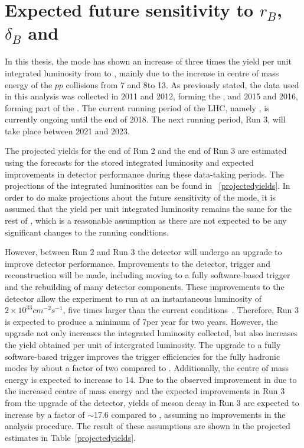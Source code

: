 \section{Expected future sensitivity to $r_B$, $\delta_B$ and \Pgamma}
\label{sec:interpretation:futuresensitivity}

In this thesis, the \btodkst mode has shown an increase of three times the yield per unit integrated luminosity from \runone to \runtwo, mainly due to the increase in centre of mass energy of the $pp$ collisions from 7 and 8\tev to 13\tev. As previously stated, the data used in this analysis was collected in 2011 and 2012, forming the \runone \dataset, and 2015 and 2016, forming part of the \runtwo \dataset. The current running period of the LHC, namely \runtwo, is currently ongoing until the end of 2018. The next running period, Run 3, will take place between 2021 and 2023.

The projected yields for the end of Run 2 and the end of Run 3 are estimated using the forecasts for the stored integrated luminosity and expected improvements in detector performance during these data-taking periods. The projections of the integrated luminosities can be found in \tab~\ref{projectedyields}. In order to do make projections about the future sensitivity of the \btodkst mode, it is assumed that the yield per unit integrated luminosity remains the same for the rest of \runtwo, which is a reasonable assumption as there are not expected to be any significant changes to the running conditions. 

However, between Run 2 and Run 3 the detector will undergo an upgrade to improve detector performance. Improvements to the detector, trigger and reconstruction will be made, including moving to a fully software-based trigger~\cite{CERN-LHCC-2014-016} and the rebuilding of many detector components. These improvements to the detector allow the experiment to run at an instantaneous luminosity of $2 \times 10^{33} cm^{-2}s^{-1}$, five times larger than the current conditions~\cite{CERN-LHCC-2014-016}. Therefore, Run 3 is expected to produce a minimum of 7\invfb per year for two years. However, the upgrade not only increases the integrated luminosity collected, but also increases the yield obtained per unit of intergrated luminosity. The upgrade to a fully software-based trigger improves the trigger efficiencies for the fully hadronic modes by about a factor of two compared to \runone. Additionally, the centre of mass energy is expected to increase to 14\tev. Due to the observed improvement in \runtwo due to the increased centre of mass energy and the expected improvements in Run 3 from the upgrade of the detector, yields of \B meson decay in Run 3 are expected to increase by a factor of $\sim$17.6 compared to \runone, assuming no improvements in the analysis procedure. The result of these assumptions are shown in the projected estimates in Table~\ref{projectedyields}.

